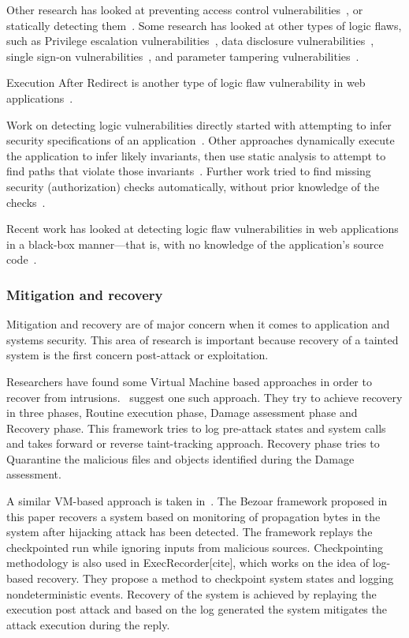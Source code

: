 \documentclass[11pt,letterpaper]{article}
\begin{document}
Other research has looked at preventing access control
vulnerabilities~\cite{dalton09:nemesis}, or statically detecting
them~\cite{sun2011}.
Some research has looked at other types of logic
flaws, such as
Privilege escalation vulnerabilities~\cite{monshizadeh2014}, data disclosure
vulnerabilities~\cite{muthukumaran2015}, single sign-on vulnerabilities~\cite{zhou2014}, and parameter tampering vulnerabilities~\cite{bisht2010, bisht2011}.

Execution After Redirect is another type of logic flaw
vulnerability in web applications~\cite{doupe2011, payet2013}.

Work on detecting logic vulnerabilities directly started with
attempting to infer security specifications of an
application~\cite{tan08:autoises, Livshits2009a}. Other approaches dynamically
execute the application to infer likely invariants, then use static
analysis to attempt to find paths that violate those
invariants~\cite{felmetsger10:logic}. Further work tried to find missing
security (authorization) checks automatically, without prior knowledge
of the checks~\cite{son2011, son2013}.

Recent work has looked at detecting logic flaw vulnerabilities in web
applications in a black-box manner---that is, with no knowledge of the
application's source code~\cite{pellegrino2014}.


\subsubsection{Mitigation and recovery}
Mitigation and recovery are of major concern when it comes to application and systems security. This area of research is important because recovery of a tainted system is the first concern post-attack or exploitation.

Researchers have found some Virtual Machine based approaches in order to recover from intrusions.~\cite{zhang2009b} suggest one such approach. They try to achieve recovery in three phases, Routine execution phase, Damage assessment phase and Recovery phase. This framework tries to log pre-attack states and system calls and takes forward or reverse taint-tracking approach. Recovery phase tries to Quarantine the malicious files and objects identified during the Damage assessment.

A similar VM-based approach is taken in~\cite{oliveria2008b}. The Bezoar framework proposed in this paper recovers a system based on monitoring of propagation bytes in the system after hijacking attack has been detected. The framework replays the checkpointed run while ignoring inputs from malicious sources. Checkpointing methodology is also used in ExecRecorder[cite], which works on the idea of log-based recovery. They propose a method to checkpoint system states and logging nondeterministic events. Recovery of the system is achieved by replaying the execution post attack and based on the log generated the system mitigates the attack execution during the reply.
\end{document}
